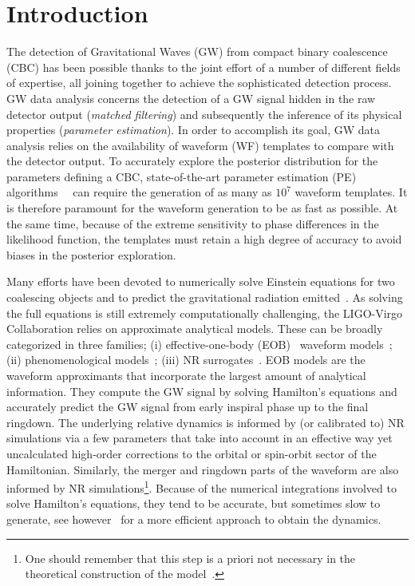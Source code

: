 \section{Introduction}
The detection of Gravitational Waves (GW) from compact binary coalescence (CBC) has been possible thanks to the joint effort of a number of different fields of expertise, all joining together to achieve the sophisticated detection process. GW data analysis concerns the detection of a GW signal hidden in the raw detector output (\textit{matched filtering}) and subsequently the inference of its physical properties (\textit{parameter estimation}). In order to accomplish its goal, GW data analysis relies on the availability of waveform (WF) templates to compare with the detector output.
To accurately explore the posterior distribution for the parameters defining a CBC, state-of-the-art parameter estimation (PE) algorithms~\cite{Aasi:2013jjl}~\cite{Veitch2014wba} can require the generation of as many as $10^7$ waveform templates. It is therefore paramount for the waveform generation to be as fast as possible. At the same time, because of the extreme sensitivity to phase differences in the likelihood  function, 
the templates must retain a high degree of accuracy to avoid biases in the posterior exploration.

Many efforts have been devoted to numerically solve Einstein equations for two coalescing objects and 
to predict the gravitational radiation emitted~\cite{Boyle:2019kee,Healy:2019jyf,Healy:2020vre}.
As solving the full equations is still extremely computationally challenging, the LIGO-Virgo Collaboration 
relies on approximate analytical models. 
These can be broadly categorized in  three families; (i) effective-one-body (EOB)~\cite{Buonanno:2000ef} 
waveform models~\cite{Damour:2009kr,Nagar:2020pcj,Chiaramello:2020ehz,Ossokine:2020kjp}; (ii) phenomenological 
models~\cite{Khan:2015jqa,Pratten:2020ceb,Estelles:2020osj}; (iii) NR surrogates~\cite{Varma:2018mmi,Williams:2019vub,Varma:2019csw,Rifat:2019ltp,Khan:2020fso}.
%
EOB models are the waveform approximants that incorporate the largest amount of analytical information.
They compute the GW signal by solving Hamilton's equations  and accurately predict the 
GW signal from early inspiral phase up to the final ringdown. The underlying relative dynamics
is informed by (or calibrated to) NR simulations via a few parameters that take into account 
in an effective way yet uncalculated high-order corrections to the orbital or spin-orbit sector 
of the Hamiltonian. Similarly, the merger and ringdown parts of the waveform are also informed by NR 
simulations\footnote{One should remember that this step is a priori not necessary in the theoretical 
construction of the model~\cite{Buonanno:2000ef,Damour:2007xr,Damour:2009wj}.}.
Because of the numerical integrations involved to solve Hamilton's equations, they tend to 
be accurate, but sometimes slow to generate, see however~\cite{Nagar:2018gnk} for a 
more efficient approach to obtain the dynamics.

